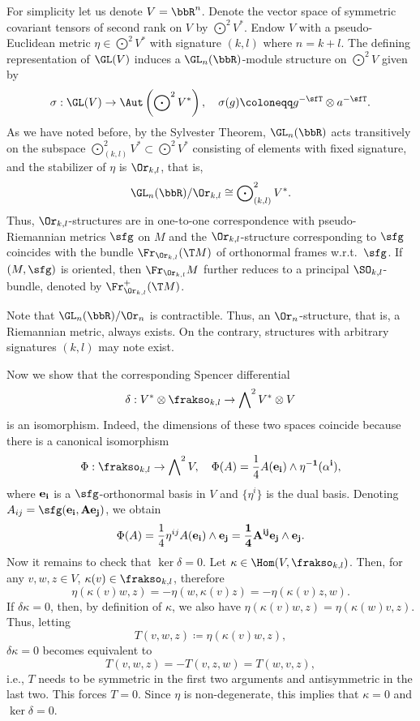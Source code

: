 \begin{example}\label{ex pseudo-riemannian structure}
    For simplicity let us denote $V=\bbR^n$. Denote the vector space of symmetric covariant tensors of second rank on $V$ by $\bigodot\nolimits^2V^\ast$. Endow $V$ with a pseudo-Euclidean metric $\eta\in \bigodot\nolimits^2V^\ast$ with signature $(k,l)$ where $n=k+l$. The defining representation of $\GL(V)$ induces a $\GL_n(\bbR)$-module structure on $\bigodot\nolimits^2 V$ given by 
    \[\sigma:\GL(V)\to \Aut\left(\bigodot\nolimits^2 V^\ast\right),\quad \sigma(g)\coloneqq g^{-\sfT}\otimes a^{-\sfT}.\label{eq 2.2.21 RS2}\]
    As we have noted before, by the Sylvester Theorem, $\GL_n(\bbR)$ acts transitively on the subspace $\bigodot\nolimits^2_{(k,l)}V^\ast\subset \bigodot\nolimits^2 V^\ast$ consisting of elements with fixed signature, and the stabilizer of $\eta$ is $\Or_{k,l}$, that is,
    \[\GL_n(\bbR)\slash \Or_{k,l}\cong \bigodot\nolimits^2_{(k,l)}V^\ast.\]
    Thus, $\Or_{k,l}$-structures are in one-to-one correspondence with pseudo-Riemannian metrics $\sfg$ on $M$ and the $\Or_{k,l}$-structure corresponding to $\sfg$ coincides with the bundle $\Fr_{\Or_{k,l}}(\T M)$ of orthonormal frames w.r.t.\ $\sfg$. If $(M,\sfg)$ is oriented, then $\Fr_{\Or_{k,l}}M$ further reduces to a principal $\SO_{k,l}$-bundle, denoted by $\Fr^+_{\Or_{k,l}}(\T M)$. 
    
    Note that $\GL_n(\bbR)\slash \Or_n$ is contractible. Thus, an $\Or_n$-structure, that is, a Riemannian metric, always exists. On the contrary, structures with arbitrary signatures $(k,l)$ may note exist. 
    
    Now we show that the corresponding Spencer differential 
    \[\delta: V^\ast\otimes \frakso_{k,l}\to \bigwedge\nolimits^2 V^\ast\otimes V\]
    is an isomorphism. Indeed, the dimensions of these two spaces coincide because there is a canonical isomorphism 
    \[\Phi: \frakso_{k,l}\to \bigwedge\nolimits^2 V,\quad \Phi(A)= \frac14 A(\bf{e}_i)\wedge \eta^{-1}(\alpha^i),\]
    where $\bf{e}_i$ is a $\sfg$-orthonormal basis in $V$ and $\{\eta^i\}$ is the dual basis. Denoting $A_{ij}=\sfg(\bf{e}_i,A\bf{e}_j)$, we obtain 
    \[\Phi(A)=\frac14 \eta^{ij}A(\bf{e}_i)\wedge\bf{e}_j=\frac14 A^{ij}\bf{e}_j\wedge\bf{e}_j.\]
    Now it remains to check that $\ker\delta=0$. Let $\kappa\in \Hom(V,\frakso_{k,l})$. Then, for any $v,w,z\in V$, $\kappa(v)\in\frakso_{k,l}$, therefore 
    \[\eta(\kappa(v)w,z)=-\eta(w,\kappa(v)z)=-\eta(\kappa(v)z,w).\]
    If $\delta\kappa=0$, then, by definition of $\kappa$, we  also have $\eta(\kappa(v)w,z)=\eta(\kappa(w)v,z)$. Thus, letting
    \[T(v,w,z)\coloneqq \eta(\kappa(v)w,z),\]
    $\delta\kappa=0$ becomes equivalent to 
    \[T(v,w,z)=-T(v,z,w)=T(w,v,z),\]
    i.e., $T$ needs to be symmetric in the first two arguments and antisymmetric in the last two. This forces $T=0$. Since $\eta$ is non-degenerate, this implies that $\kappa=0$ and $\ker\delta=0$. 
    

\end{example}
